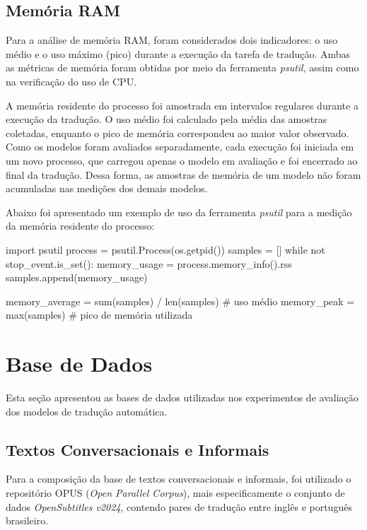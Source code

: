 \subsection{Memória RAM}

Para a análise de memória RAM, foram considerados dois indicadores: o uso médio e o uso máximo (pico) durante a execução da tarefa de tradução. Ambas as métricas de memória foram obtidas por meio da ferramenta \textit{psutil}, assim como na verificação do uso de CPU.

A memória residente do processo foi amostrada em intervalos regulares durante a execução da tradução. O uso médio foi calculado pela média das amostras coletadas, enquanto o pico de memória correspondeu ao maior valor observado. Como os modelos foram avaliados separadamente, cada execução foi iniciada em um novo processo, que carregou apenas o modelo em avaliação e foi encerrado ao final da tradução. Dessa forma, as amostras de memória de um modelo não foram acumuladas nas medições dos demais modelos.

Abaixo foi apresentado um exemplo de uso da ferramenta \textit{psutil} para a medição da memória residente do processo:

\begin{listing}
\begin{python}
import psutil
process = psutil.Process(os.getpid())
samples = []
while not stop_event.is_set():
    memory_usage = process.memory_info().rss
    samples.append(memory_usage)

memory_average = sum(samples) / len(samples) # uso médio
memory_peak = max(samples) # pico de memória utilizada

\end{python}
\caption{Exemplo de uso da ferramenta \textit{psutil} para verificação de uso de memória RAM}
\label{code:memory}
\end{listing}

\section{Base de Dados}
\label{Database}
Esta seção apresentou as bases de dados utilizadas nos experimentos de avaliação dos modelos de tradução automática.

\subsection{Textos Conversacionais e Informais}

Para a composição da base de textos conversacionais e informais, foi utilizado o repositório OPUS (\textit{Open Parallel Corpus}), mais especificamente o conjunto de dados \textit{OpenSubtitles v2024}, contendo pares de tradução entre inglês e português brasileiro.

